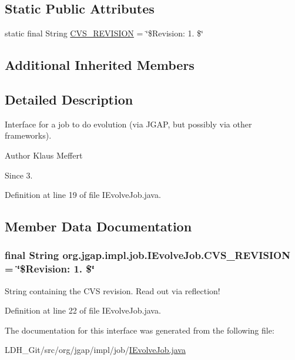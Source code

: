 \subsection*{Static Public Attributes}
\begin{DoxyCompactItemize}
\item 
static final String \hyperlink{interfaceorg_1_1jgap_1_1impl_1_1job_1_1_i_evolve_job_a6844399e9da2060a0a09d3aa4fd68e30}{C\-V\-S\-\_\-\-R\-E\-V\-I\-S\-I\-O\-N} = \char`\"{}\$Revision\-: 1. \$\char`\"{}
\end{DoxyCompactItemize}
\subsection*{Additional Inherited Members}


\subsection{Detailed Description}
Interface for a job to do evolution (via J\-G\-A\-P, but possibly via other frameworks).

\begin{DoxyAuthor}{Author}
Klaus Meffert 
\end{DoxyAuthor}
\begin{DoxySince}{Since}
3. 
\end{DoxySince}


Definition at line 19 of file I\-Evolve\-Job.\-java.



\subsection{Member Data Documentation}
\hypertarget{interfaceorg_1_1jgap_1_1impl_1_1job_1_1_i_evolve_job_a6844399e9da2060a0a09d3aa4fd68e30}{
\subsubsection[{C\-V\-S\-\_\-\-R\-E\-V\-I\-S\-I\-O\-N}]{\setlength{\rightskip}{0pt plus 5cm}final String org.\-jgap.\-impl.\-job.\-I\-Evolve\-Job.\-C\-V\-S\-\_\-\-R\-E\-V\-I\-S\-I\-O\-N = \char`\"{}\$Revision\-: 1. \$\char`\"{}\hspace{0.3cm}{\ttfamily [static]}}}\label{interfaceorg_1_1jgap_1_1impl_1_1job_1_1_i_evolve_job_a6844399e9da2060a0a09d3aa4fd68e30}
String containing the C\-V\-S revision. Read out via reflection! 

Definition at line 22 of file I\-Evolve\-Job.\-java.



The documentation for this interface was generated from the following file\-:\begin{DoxyCompactItemize}
\item 
L\-D\-H\-\_\-\-Git/src/org/jgap/impl/job/\hyperlink{_i_evolve_job_8java}{I\-Evolve\-Job.\-java}\end{DoxyCompactItemize}

